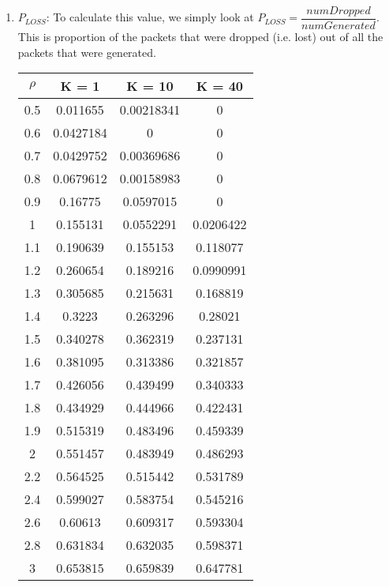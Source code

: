\documentclass{article}
\begin{document}
\begin{enumerate}
    \item $P_{LOSS}$: To calculate this value, we simply look at $P_{LOSS} = \dfrac{numDropped}{numGenerated}$. This is proportion of the packets
    that were dropped (i.e. lost) out of all the packets that were generated. \newline
    \begin{center}
        \begin{tabular}{||c c c c||}
        \hline
        $\rho$ & K = 1 & K = 10 & K = 40 \\ [0.5ex]
        \hline\hline
        0.5 & 0.011655 & 0.00218341 & 0 \\
        \hline
        0.6 & 0.0427184 & 0 & 0 \\
        \hline
        0.7 & 0.0429752 & 0.00369686 & 0 \\
        \hline
        0.8 & 0.0679612 & 0.00158983 & 0 \\
        \hline
        0.9 & 0.16775 & 0.0597015 & 0 \\
        \hline
        1 & 0.155131 & 0.0552291 & 0.0206422 \\
        \hline
        1.1 & 0.190639 & 0.155153 & 0.118077 \\
        \hline
        1.2 & 0.260654 & 0.189216 & 0.0990991 \\
        \hline
        1.3 & 0.305685 & 0.215631 & 0.168819 \\
        \hline
        1.4 & 0.3223 & 0.263296 & 0.28021 \\
        \hline
        1.5 & 0.340278 & 0.362319 & 0.237131 \\
        \hline
        1.6 & 0.381095 & 0.313386 & 0.321857 \\
        \hline
        1.7 & 0.426056 & 0.439499 & 0.340333 \\
        \hline
        1.8 & 0.434929 & 0.444966 & 0.422431 \\
        \hline
        1.9 & 0.515319 & 0.483496 & 0.459339 \\
        \hline
        2 & 0.551457 & 0.483949 & 0.486293 \\
        \hline
        2.2 & 0.564525 & 0.515442 & 0.531789 \\
        \hline
        2.4 & 0.599027 & 0.583754 & 0.545216 \\
        \hline
        2.6 & 0.60613 & 0.609317 & 0.593304 \\
        \hline
        2.8 & 0.631834 & 0.632035 & 0.598371 \\
        \hline
        3 & 0.653815 & 0.659839 & 0.647781 \\

\end{tabular}
\end{center}
\end{enumerate}
\end{document}
